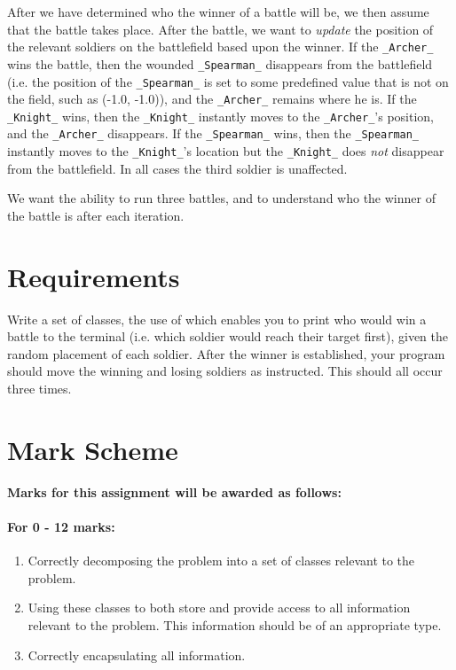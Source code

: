 \documentclass[11pt]{article}
\begin{document}
After we have determined who the winner of a battle will be, we then assume that the battle takes place. After the battle, we want to \emph{update} the position of the relevant soldiers on the battlefield based upon the winner. If the \texttt{_Archer_} wins the battle, then the wounded \texttt{_Spearman_} disappears from the battlefield (i.e. the position of the \texttt{_Spearman_} is set to some predefined value that is not on the field, such as (-1.0, -1.0)), and the \texttt{_Archer_} remains where he is. If the \texttt{_Knight_} wins, then the \texttt{_Knight_} instantly moves to the \texttt{_Archer_}'s position, and the \texttt{_Archer_} disappears. If the \texttt{_Spearman_} wins, then the \texttt{_Spearman_} instantly moves to the \texttt{_Knight_}'s location but the \texttt{_Knight_} does \emph{not} disappear from the battlefield. In all cases the third soldier is unaffected.

We want the ability to run three battles, and to understand who the winner of the battle is after each iteration.

\section{Requirements}

Write a set of classes, the use of which enables you to print who would win a battle to the terminal (i.e. which soldier would reach their target first), given the random placement of each soldier. After the winner is established, your program should move the winning and losing soldiers as instructed. This should all occur three times.

\section{Mark Scheme}

\textbf{Marks for this assignment will be awarded as follows:}

\paragraph{For 0 - 12 marks:}
								\begin{enumerate}
								\item Correctly decomposing the problem into a set of classes relevant to the problem.
								\item Using these classes to both store and provide access to all information relevant to the problem. This information should be of an appropriate type.
								\item Correctly encapsulating all information.
								\end{enumerate} %
\end{document}
